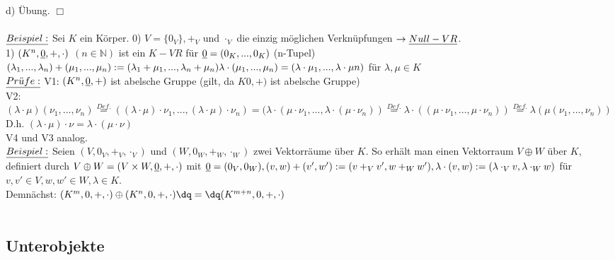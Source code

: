 \documentclass[fleqn, a4paper, 11pt]{article}
\begin{document}
d) \"Ubung. \hfill $\Box$\\
\\
$\uline{Beispiel:}$ Sei $K$ ein K\"orper. 0) $V=\{0_{V}\},+_{V}$ und $\cdot_{V}$ die einzig m\"oglichen Verkn\"upfungen $\rightarrow\uline{Null-VR}$.\\
1) $(K^{n},\uline{0},+,\cdot)$ $(n\in\mathbb{N})$ ist ein $K-VR$ f\"ur $\uline{0}=(0_{K},...,0_{K})$ (n-Tupel)\\
$(\lambda_{1},...,\lambda_{n})+(\mu_{1},...,\mu_{n}):=(\lambda_{1}+\mu_{1},...,\lambda_{n}+\mu_{n})\\
\lambda\cdot(\mu_{1},...,\mu_{n})=(\lambda\cdot\mu_{1},...,\lambda\cdot\mu{n})$ f\"ur $\lambda,\mu\in K$\\
$\uline{Pr\ddot{u}fe:}$ V1: $(K^{n},\uline{0},+)$ ist abelsche Gruppe (gilt, da $K0,+)$ ist abelsche Gruppe)\\
V2: $(\lambda\cdot\mu)(\nu_{1},...,\nu_{n})\stackrel{Def.}{=}((\lambda\cdot\mu)\cdot\nu_{1},...,(\lambda\cdot\mu)\cdot\nu_{n})=(\lambda\cdot(\mu\cdot\nu_{1},...,\lambda\cdot(\mu\cdot\nu_{n}))\stackrel{Def.}{=}\lambda\cdot((\mu\cdot\nu_{1},...,\mu\cdot\nu_{n}))\stackrel{Def.}{=}\lambda(\mu(\nu_{1},...,\nu_{n}))$ D.h. $(\lambda\cdot\mu)\cdot\nu=\lambda\cdot(\mu\cdot\nu)$\\
V4 und V3 analog.\\
$\uline{Beispiel:}$ Seien $(V,0_{V},+_{V},\cdot_{V})$ und $(W,0_{W},+_{W},\cdot_{W})$ zwei Vektorr\"aume \"uber $K$. So erh\"alt man einen Vektorraum $V\oplus W$ \"uber $K$, definiert durch $V\oplus W=(V\times W,\uline{0},+,\cdot)$ mit $\uline{0}=(0_{V},0_{W}),(v,w)+(v',w'):=(v+_{V}v',w+_{W}w'),\lambda\cdot(v,w):=(\lambda\cdot_{V}v,\lambda\cdot_{W}w)$ f\"ur $v,v'\in V,w,w'\in W,\lambda\in K$.\\
Demn\"achst: $(K^{m},0,+,\cdot)\oplus(K^{n},0,+,\cdot)\dq=\dq(K^{m+n},0,+,\cdot)$\\
\\
\subsection{Unterobjekte}
\end{document}

